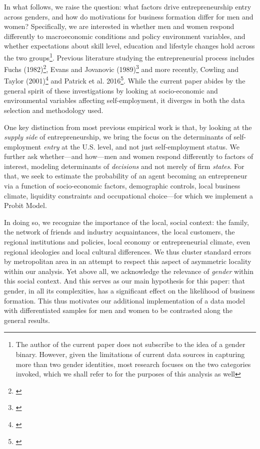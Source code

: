 In what follows, we raise the question: what factors drive entrepreneurship entry across genders, and how do motivations for business formation differ for men and women? Specifically, we are interested in whether men and women respond differently to macroeconomic conditions and policy environment variables, and whether expectations about skill level, education and lifestyle changes hold across the two groups\footnote{The author of the current paper does not subscribe to the idea of a gender binary. However, given the limitations of current data sources in capturing more than two gender identities, most research focuses on the two categories invoked, which we shall refer to for the purposes of this analysis as well}. Previous literature studying the entrepreneurial process includes Fuchs (1982)\footnote{\cite{fuchs1980self}}, Evans and Jovanovic (1989)\footnote{\cite{EvansJovanovic1989}} and more recently, Cowling and Taylor (2001)\footnote{\cite{CowlingTaylor2001}} and Patrick et al. 2016\footnote{\cite{PatrickStephensWeinstein2016}}.  While the current paper abides by the general spirit of these investigations by looking at socio-economic and environmental variables affecting self-employment, it diverges in both the data selection and methodology used. 

One key distinction from most previous empirical work is that, by looking at the \textit{supply side} of entrepreneurship, we bring the focus on the determinants of self-employment \textit{entry} at the U.S. level, and not just self-employment status. We further ask whether---and how---men and women respond differently to factors of interest, modeling determinants of \textit{decisions} and not merely of firm \textit{states}. For that, we seek to estimate the probability  of an agent becoming an entrepreneur via a function of socio-economic factors, demographic controls, local business climate, liquidity constraints and occupational choice---for which we implement a Probit Model. 

In doing so, we recognize the importance of the local, social context: the family, the network of friends and industry acquaintances, the local customers, the regional institutions and policies, local economy or entrepreneurial climate, even regional ideologies and local cultural differences. We thus cluster standard errors by metropolitan area in an attempt to respect this aspect of asymmetric locality within our analysis. Yet above all, we acknowledge the relevance of \textit{gender} within this social context. And this serves as our main hypothesis for this paper: that gender, in all its complexities,  has a significant effect on the likelihood of business formation. This thus motivates our additional implementation of a data model with differentiated samples for men and women to be contrasted along the general results. 

